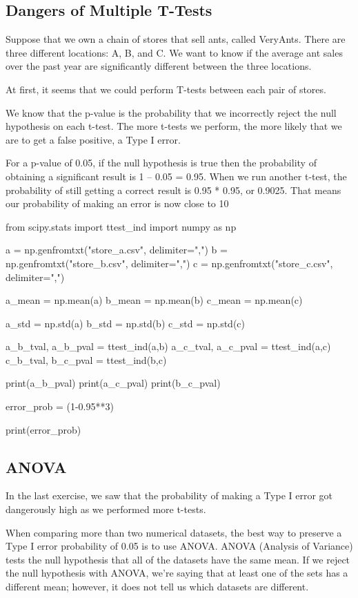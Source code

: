 \documentclass{journal}
\begin{document}
\subsection{Dangers of Multiple T-Tests}
Suppose that we own a chain of stores that sell ants, called VeryAnts. There are three different locations: A, B, and C. We want to know if the average ant sales over the past year are significantly different between the three locations.

At first, it seems that we could perform T-tests between each pair of stores.

We know that the p-value is the probability that we incorrectly reject the null hypothesis on each t-test. The more t-tests we perform, the more likely that we are to get a false positive, a Type I error.

For a p-value of 0.05, if the null hypothesis is true then the probability of obtaining a significant result is 1 – 0.05 = 0.95. When we run another t-test, the probability of still getting a correct result is 0.95 * 0.95, or 0.9025. That means our probability of making an error is now close to 10%

from scipy.stats import ttest_ind
import numpy as np

a = np.genfromtxt("store_a.csv",  delimiter=",")
b = np.genfromtxt("store_b.csv",  delimiter=",")
c = np.genfromtxt("store_c.csv",  delimiter=",")

a_mean = np.mean(a)
b_mean = np.mean(b)
c_mean = np.mean(c)

a_std = np.std(a)
b_std = np.std(b)
c_std = np.std(c)

a_b_tval, a_b_pval = ttest_ind(a,b)
a_c_tval, a_c_pval = ttest_ind(a,c)
c_b_tval, b_c_pval = ttest_ind(b,c)

print(a_b_pval)
print(a_c_pval)
print(b_c_pval)

error_prob = (1-0.95**3)

print(error_prob)

\subsection{ANOVA}
In the last exercise, we saw that the probability of making a Type I error got dangerously high as we performed more t-tests.

When comparing more than two numerical datasets, the best way to preserve a Type I error probability of 0.05 is to use ANOVA. ANOVA (Analysis of Variance) tests the null hypothesis that all of the datasets have the same mean. If we reject the null hypothesis with ANOVA, we're saying that at least one of the sets has a different mean; however, it does not tell us which datasets are different.
\end{document}
